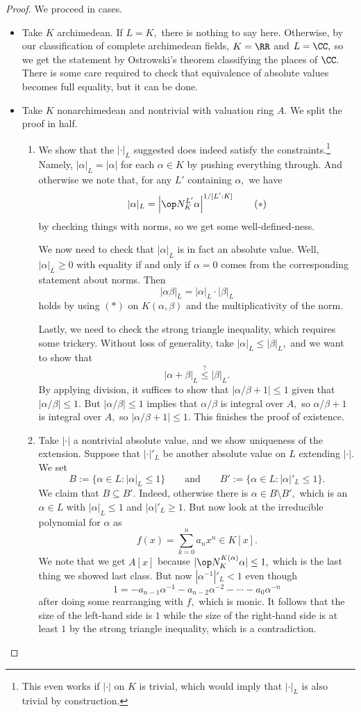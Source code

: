 \documentclass[../notes.tex]{subfiles}
\begin{document}
\begin{proof}
	We proceed in cases.
	\begin{itemize}
		\item Take $K$ archimedean. If $L=K,$ there is nothing to say here. Otherwise, by our classification of complete archimedean fields, $K=\RR$ and $L=\CC,$ so we get the statement by Ostrowski's theorem classifying the places of $\CC.$ There is some care required to check that equivalence of absolute values becomes full equality, but it can be done.
		\item Take $K$ nonarchimedean and nontrivial with valuation ring $A.$ We split the proof in half.
		\begin{enumerate}[label=(\alph*)]
			\item We show that the $|\cdot|_L$ suggested does indeed satisfy the constraints.\footnote{This even works if $|\cdot|$ on $K$ is trivial, which would imply that $|\cdot|_L$ is also trivial by construction.} Namely, $|\alpha|_L=|\alpha|$ for each $\alpha\in K$ by pushing everything through. And otherwise we note that, for any $L'$ containing $\alpha,$ we have
			\[|\alpha|_L=\left|\op N^{L'}_K\alpha\right|^{1/[L':K]}\tag{$*$}\]
			by checking things with norms, so we get some well-defined-ness.

			We now need to check that $|\alpha|_L$ is in fact an absolute value. Well, $|\alpha|_L\ge0$ with equality if and only if $\alpha=0$ comes from the corresponding statement about norms. Then
			\[|\alpha\beta|_L=|\alpha|_L\cdot|\beta|_L\]
			holds by using $(*)$ on $K(\alpha,\beta)$ and the multiplicativity of the norm.

			Lastly, we need to check the strong triangle inequality, which requires some trickery. Without loss of generality, take $|\alpha|_L\le|\beta|_L,$ and we want to show that
			\[|\alpha+\beta|_L\stackrel?\le|\beta|_L.\]
			By applying division, it suffices to show that $|\alpha/\beta+1|\le1$ given that $|\alpha/\beta|\le1.$ But $|\alpha/\beta|\le1$ implies that $\alpha/\beta$ is integral over $A,$ so $\alpha/\beta+1$ is integral over $A,$ so $|\alpha/\beta+1|\le1.$ This finishes the proof of existence.

			\item Take $|\cdot|$ a nontrivial absolute value, and we show uniqueness of the extension. Suppose that $|\cdot|'_L$ be another absolute value on $L$ extending $|\cdot|.$ We set
			\[B:=\{\alpha\in L:|\alpha|_L\le1\}\qquad\text{and}\qquad B':=\{\alpha\in L:|\alpha|'_L\le1\}.\]
			We claim that $B\subseteq B'.$ Indeed, otherwise there is $\alpha\in B\setminus B',$ which is an $\alpha\in L$ with $|\alpha|_L\le1$ and $|\alpha|'_L\ge1.$ But now look at the irreducible polynomial for $\alpha$ as
			\[f(x)=\sum_{k=0}^na_nx^n\in K[x].\]
			We note that we get $A[x]$ because $|\op N_K^{K(\alpha)}\alpha|\le1,$ which is the last thing we showed last class. But now $|\alpha^{-1}|'_L<1$ even though
			\[1=-a_{n-1}\alpha^{-1}-a_{n-2}\alpha^{-2}-\cdots-a_0\alpha^{-n}\]
			after doing some rearranging with $f,$ which is monic. It follows that the size of the left-hand side is $1$ while the size of the right-hand side is at least $1$ by the strong triangle inequality, which is a contradiction.


\end{enumerate}
\end{itemize}
\end{proof}
\end{document}
